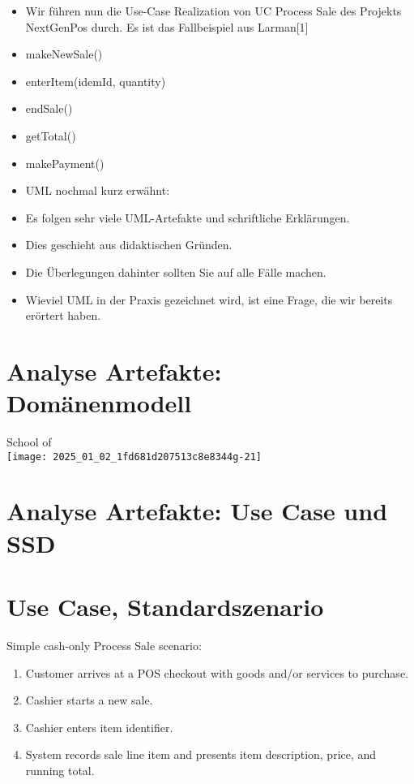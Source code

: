 \documentclass[10pt]{article}
\begin{document}
\begin{itemize}
  \item Wir führen nun die Use-Case Realization von UC Process Sale des Projekts NextGenPos durch. Es ist das Fallbeispiel aus Larman[1]
  \item makeNewSale()
  \item enterItem(idemId, quantity)
  \item endSale()
  \item getTotal()
  \item makePayment()
  \item UML nochmal kurz erwähnt:
  \item Es folgen sehr viele UML-Artefakte und schriftliche Erklärungen.
  \item Dies geschieht aus didaktischen Gründen.
  \item Die Überlegungen dahinter sollten Sie auf alle Fälle machen.
  \item Wieviel UML in der Praxis gezeichnet wird, ist eine Frage, die wir bereits erörtert haben.
\end{itemize}

\section*{Analyse Artefakte: Domänenmodell}
School of\\
\texttt{[image: 2025\_01\_02\_1fd681d207513c8e8344g-21]}

\section*{Analyse Artefakte: Use Case und SSD}
\section*{Use Case, Standardszenario}
Simple cash-only Process Sale scenario:

\begin{enumerate}
  \item Customer arrives at a POS checkout with goods and/or services to purchase.
  \item Cashier starts a new sale.
  \item Cashier enters item identifier.
  \item System records sale line item and presents item description, price, and running total.
\end{enumerate}
\end{document}
